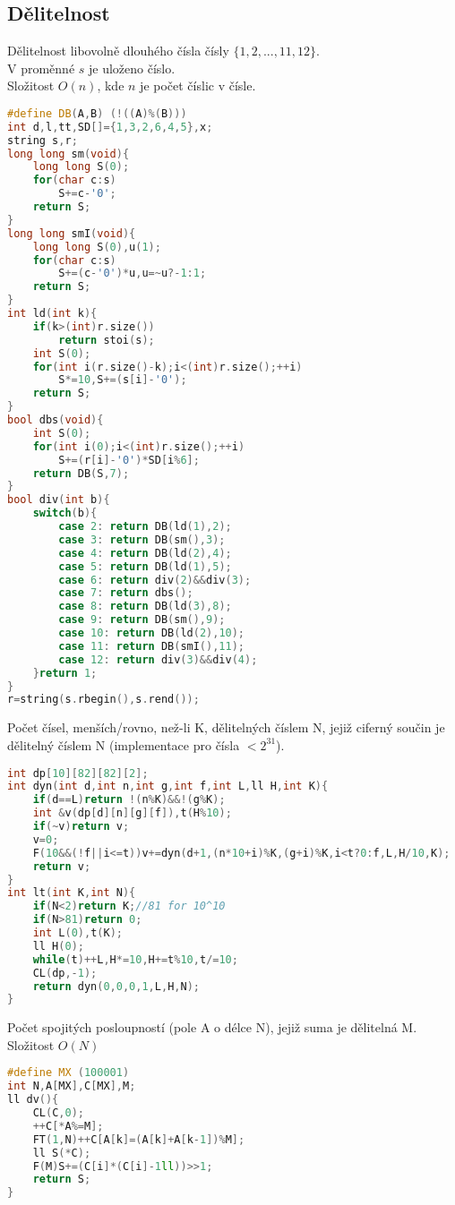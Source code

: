 \documentclass[11pt]{article}
\begin{document}
\subsection{Dělitelnost}
Dělitelnost libovolně dlouhého čísla čísly $\{1,2,...,11,12\}$.
\\V proměnné $s$ je uloženo číslo.
\\Složitost $O(n)$, kde $n$ je počet číslic v čísle.
\begin{lstlisting}[language=C++]
#define DB(A,B) (!((A)%(B)))
int d,l,tt,SD[]={1,3,2,6,4,5},x;
string s,r;
long long sm(void){
    long long S(0);
    for(char c:s)
        S+=c-'0';
    return S;
}
long long smI(void){
    long long S(0),u(1);
    for(char c:s)
        S+=(c-'0')*u,u=~u?-1:1;
    return S;
}
int ld(int k){
    if(k>(int)r.size())
        return stoi(s);
    int S(0);
    for(int i(r.size()-k);i<(int)r.size();++i)
        S*=10,S+=(s[i]-'0');
    return S;
}
bool dbs(void){
    int S(0);
    for(int i(0);i<(int)r.size();++i)
        S+=(r[i]-'0')*SD[i%6];
    return DB(S,7);
}
bool div(int b){
    switch(b){
        case 2: return DB(ld(1),2);
        case 3: return DB(sm(),3);
        case 4: return DB(ld(2),4);
        case 5: return DB(ld(1),5);
        case 6: return div(2)&&div(3);
        case 7: return dbs();
        case 8: return DB(ld(3),8);
        case 9: return DB(sm(),9);
        case 10: return DB(ld(2),10);
        case 11: return DB(smI(),11);
        case 12: return div(3)&&div(4);
    }return 1;
}
r=string(s.rbegin(),s.rend());
\end{lstlisting}
Počet čísel, menších/rovno, než-li \textsf{K}, dělitelných číslem \textsf{N}, jejiž ciferný součin je dělitelný číslem \textsf{N} (implementace pro čísla $<2^{31}$).
\begin{lstlisting}[language=C++]
int dp[10][82][82][2];
int dyn(int d,int n,int g,int f,int L,ll H,int K){
    if(d==L)return !(n%K)&&!(g%K);
    int &v(dp[d][n][g][f]),t(H%10);
    if(~v)return v;
    v=0;
    F(10&&(!f||i<=t))v+=dyn(d+1,(n*10+i)%K,(g+i)%K,i<t?0:f,L,H/10,K);
    return v;
}
int lt(int K,int N){
    if(N<2)return K;//81 for 10^10
    if(N>81)return 0;
    int L(0),t(K);
    ll H(0);
    while(t)++L,H*=10,H+=t%10,t/=10;
    CL(dp,-1);
    return dyn(0,0,0,1,L,H,N);
}
\end{lstlisting}
Počet spojitých posloupností (pole \textsf{A} o délce \textsf{N}), jejiž suma je dělitelná \textsf{M}.
\\Složitost $O(N)$
\begin{lstlisting}[language=C++]
#define MX (100001)
int N,A[MX],C[MX],M;
ll dv(){
    CL(C,0);
    ++C[*A%=M];
    FT(1,N)++C[A[k]=(A[k]+A[k-1])%M];
    ll S(*C);
    F(M)S+=(C[i]*(C[i]-1ll))>>1;
    return S;
}
\end{lstlisting}
\end{document}
